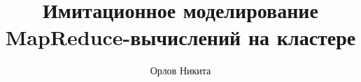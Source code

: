 \documentclass[a4paper,14pt]{article}
\begin{document}
    \author{Орлов Никита}
    \title{Имитационное моделирование MapReduce-вычислений на кластере}
    \maketitle

    

    \printbibliography
\end{document}

